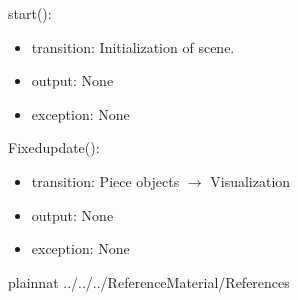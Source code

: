 \documentclass[12pt, titlepage]{article}
\begin{document}
\noindent start():
\begin{itemize}
	\item transition: Initialization of scene.
	\item output: None 
	\item exception: None  
\end{itemize}

\noindent Fixedupdate():
\begin{itemize}
	\item transition: Piece objects $\rightarrow$ Visualization 
	\item output: None 
	\item exception: None  
\end{itemize}


\newpage

 {plainnat}
 {../../../ReferenceMaterial/References}

\newpage
\end{document}
